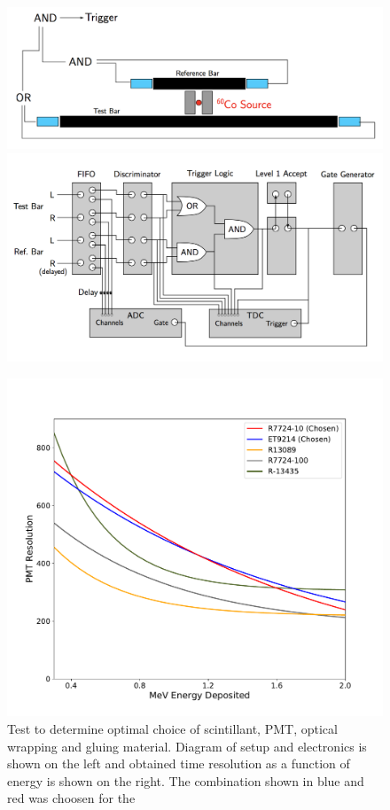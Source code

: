 \documentclass[3p,final,twocolumn]{elsarticle}
\begin{document}
\begin{figure}[h!]
	\centering
	\begin{minipage}{0.48\textwidth}
		\includegraphics[width=\textwidth]{phys_setup.png} \\
		\includegraphics[width=\textwidth]{electr_setup.png}
	\end{minipage}
	\begin{minipage}{0.48\textwidth}
		\includegraphics[width=\textwidth]{test-stand/test-resolutions.pdf}
	\end{minipage}
	\caption{Test to determine optimal choice of scintillant, PMT, optical wrapping and gluing material. Diagram of setup and electronics is shown on the left and obtained time resolution as a function of energy is shown on the right. The combination shown in blue and red was choosen for the }
	\label{fig:test_stand}
\end{figure}
\end{document}
